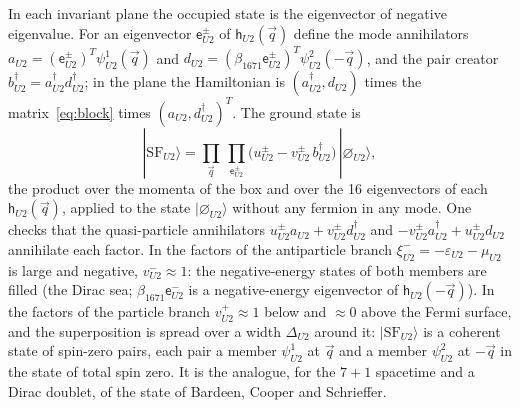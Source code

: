 In each invariant plane the occupied state is the eigenvector of negative eigenvalue. For an
eigenvector $\mathsf e^\pm_{U2}$ of $\mathsf h_{U2}(\vec q)$ define the mode annihilators
$a_{U2}=(\mathsf e^\pm_{U2})^T\psi^1_{U2}(\vec q)$ and $d_{U2}=(\beta_{1671}\mathsf
e^\pm_{U2})^T\psi^2_{U2}(-\vec q)$, and the pair creator $b^\dagger_{U2}=a^\dagger_{U2}d^\dagger_{U2}$; in the
plane the Hamiltonian is $(a^\dagger_{U2},d_{U2})$ times the matrix~\eqref{eq:block} times
$(a_{U2},d^\dagger_{U2})^T$. The ground state is
\begin{equation}
|\mathrm{SF}_{U2}\rangle=\prod_{\vec q}\ \prod_{\mathsf e^\pm_{U2}}\big(u^\pm_{U2}-v^\pm_{U2}\,b^\dagger_{U2}\big)\,|\varnothing_{U2}\rangle,
\label{eq:SF}
\end{equation}
the product over the momenta of the box and over the 16 eigenvectors of each $\mathsf
h_{U2}(\vec q)$, applied to the state $|\varnothing_{U2}\rangle$ without any fermion in any mode.
One checks that the quasi-particle annihilators $u^\pm_{U2}a_{U2}+v^\pm_{U2}d^\dagger_{U2}$ and
$-v^\pm_{U2}a^\dagger_{U2}+u^\pm_{U2}d_{U2}$ annihilate each factor. In the factors of the
antiparticle branch $\xi^-_{U2}=-\varepsilon_{U2}-\mu_{U2}$ is large and negative, $v^-_{U2}\approx1$:
the negative-energy states of both members are filled (the Dirac sea; $\beta_{1671}\mathsf
e^-_{U2}$ is a negative-energy eigenvector of $\mathsf h_{U2}(-\vec q)$). In the factors of the
particle branch $v^+_{U2}\approx1$ below and $\approx0$ above the Fermi surface, and the
superposition is spread over a width $\Delta_{U2}$ around it: $|\mathrm{SF}_{U2}\rangle$ is a
coherent state of spin-zero pairs, each pair a member $\psi^1_{U2}$ at $\vec q$ and a member
$\psi^2_{U2}$ at $-\vec q$ in the state of total spin zero. It is the analogue, for the $7+1$
spacetime and a Dirac doublet, of the state of Bardeen, Cooper and Schrieffer.

